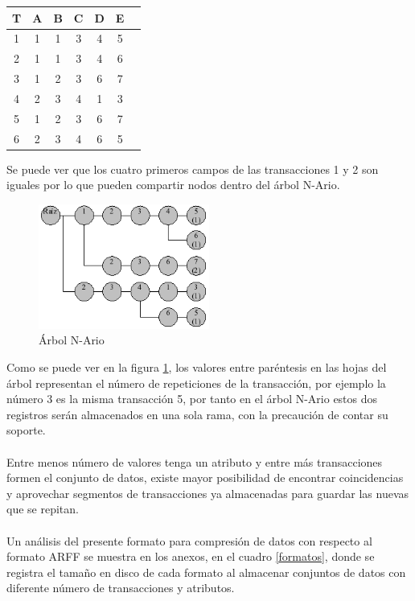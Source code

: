 \begin{center}
\begin{tabular}{|c|c|c|c|c|c|c|} \hline
\textbf{T} & \textbf{A} & \textbf{B} & \textbf{C} & \textbf{D} & \textbf{E} \\ \hline
1 & 1 & 1 & 3 & 4 & 5 \\ \hline
2 & 1 & 1 & 3 & 4 & 6 \\ \hline
3 & 1 & 2 & 3 & 6 & 7 \\ \hline
4 & 2 & 3 & 4 & 1 & 3 \\ \hline
5 & 1 & 2 & 3 & 6 & 7 \\ \hline
6 & 2 & 3 & 4 & 6 & 5 \\ \hline
\end{tabular}
\end{center}

Se puede ver que los cuatro primeros campos de las transacciones 1 y 2 son iguales por lo que pueden compartir
nodos dentro del \'arbol N-Ario.\\

\begin{figure}[ht]
\centering
\includegraphics[width=0.5\textwidth]{images/nario2.png}
\caption{\'Arbol N-Ario}
\label{nario}
\end{figure}

Como se puede ver en la figura \ref{nario}, los valores entre par\'entesis en las hojas del \'arbol representan 
el n\'umero de repeticiones de la transacci\'on, por ejemplo la n\'umero 3 es la misma transacci\'on 5, por tanto
en el \'arbol N-Ario estos dos registros ser\'an almacenados en una sola rama, con la precauci\'on de contar su
soporte.\\
\\
Entre menos n\'umero de valores tenga un atributo y entre m\'as transacciones formen el conjunto de datos, existe
mayor posibilidad de encontrar coincidencias y aprovechar segmentos de transacciones ya almacenadas para guardar
las nuevas que se repitan.\\
\\
Un an\'alisis del presente formato para compresi\'on de datos con respecto al formato ARFF se muestra en los
anexos, en el cuadro \ref{formatos}, donde se registra el tama\~no en disco de cada formato al almacenar
conjuntos de datos con diferente n\'umero de transacciones y atributos.

